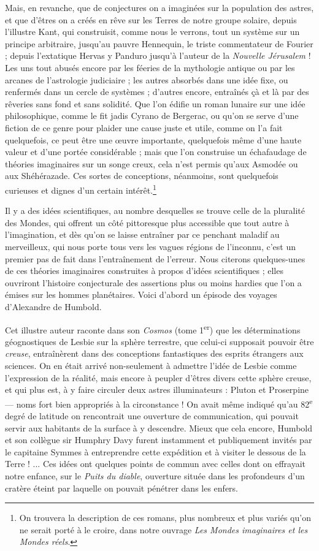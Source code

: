 \documentclass[a4paper, 11pt, oneside]{article}
\begin{document}
Mais, en revanche, que de conjectures on a imaginées sur la population des astres, et que d'êtres on a créés en rêve sur les Terres de notre groupe solaire, depuis l'illustre Kant, qui construisit, comme nous le verrons, tout un système sur un principe arbitraire, jusqu'au pauvre Hennequin, le triste commentateur de Fourier ; depuis l'extatique Hervas y Panduro jusqu'à l'auteur de la \emph{Nouvelle Jérusalem} ! Les uns tout abusés encore par les féeries de la mythologie antique ou par les arcanes de l'astrologie judiciaire ; les autres absorbés dans une idée fixe, ou renfermés dans un cercle de systèmes ; d'autres encore, entraînés çà et là par des rêveries sans fond et sans solidité. Que l'on édifie un roman lunaire sur une idée philosophique, comme le fit jadis Cyrano de Bergerac, ou qu'on se serve d'une fiction de ce genre pour plaider une cause juste et utile, comme on l'a fait quelquefois, ce peut être une œuvre importante, quelquefois même d'une haute valeur et d'une portée considérable ; mais que l'on construise un échafaudage de théories imaginaires sur un songe creux, cela n'est permis qu'aux Asmodée ou aux Shéhérazade. Ces sortes de conceptions, néanmoins, sont quelquefois curieuses et dignes d'un certain intérêt.\footnote{On trouvera la description de ces romans, plus nombreux et plus variés qu'on ne serait porté à le croire, dans notre ouvrage \emph{Les Mondes imaginaires et les Mondes réels}.}

Il y a des idées scientifiques, au nombre desquelles se trouve celle de la pluralité des Mondes, qui offrent un côté pittoresque plus accessible que tout autre à l'imagination, et dès qu'on se laisse entraîner par ce penchant maladif au merveilleux, qui nous porte tous vers les vagues régions de l'inconnu, c'est un premier pas de fait dans l'entraînement de l'erreur. Nous citerons quelques-unes de ces théories imaginaires construites à propos d'idées scientifiques ; elles ouvriront l'histoire conjecturale des assertions plus ou moins hardies que l'on a émises sur les hommes planétaires. Voici d'abord un épisode des voyages d'Alexandre de Humbold.

Cet illustre auteur raconte dans son \emph{Cosmos} (tome 1\textsuperscript{er}) que les déterminations géognostiques de Lesbie sur la sphère terrestre, que celui-ci supposait pouvoir être \emph{creuse}, entraînèrent dans des conceptions fantastiques des esprits étrangers aux sciences. On en était arrivé non-seulement à admettre l'idée de Lesbie comme l'expression de la réalité, mais encore à peupler d'êtres divers cette sphère creuse, et qui plus est, à y faire circuler deux astres illuminateurs : Pluton et Proserpine --- noms fort bien appropriés à la circonstance ! On avait même indiqué qu'au 82\textsuperscript{e} degré de latitude on rencontrait une ouverture de communication, qui pouvait servir aux habitants de la surface à y descendre. Mieux que cela encore, Humbold et son collègue sir Humphry Davy furent instamment et publiquement invités par le capitaine Symmes à entreprendre cette expédition et à visiter le dessous de la Terre ! ... Ces idées ont quelques points de commun avec celles dont on effrayait notre enfance, sur le \emph{Puits du diable}, ouverture située dans les profondeurs d'un cratère éteint par laquelle on pouvait pénétrer dans les enfers.
\end{document}
